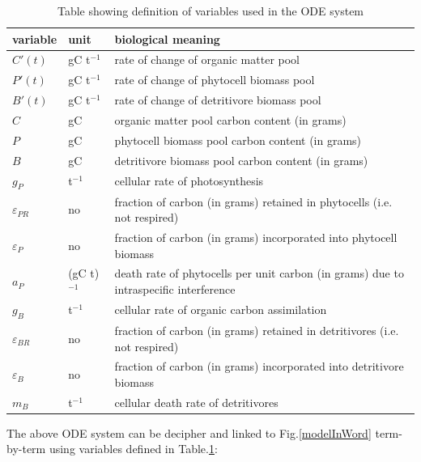 \documentclass[../thesis.tex]{subfiles} %
\newcommand{\gP}{g_P}
\newcommand{\eP}{\varepsilon_P}
\newcommand{\aP}{a_P}
\newcommand{\ePR}{\varepsilon_{PR}}
\newcommand{\gB}{g_B}
\newcommand{\eB}{\varepsilon_B}
\newcommand{\mB}{m_B}
\newcommand{\eBR}{\varepsilon_{BR}}
\begin{document}
\begin{table}[H]
    \centering
    \caption[Algebra variables definitions]{Table showing definition of variables used in the ODE system}
    \begin{tabular}{p{.1\linewidth}p{.1\linewidth}p{.7\linewidth}}\hline
        variable & unit & biological meaning \\\hline
        $C'(t)$ & gC t$^{-1}$ & rate of change of organic matter pool\\
        $P'(t)$ & gC t$^{-1}$ & rate of change of phytocell biomass pool\\
        $B'(t)$ & gC t$^{-1}$ & rate of change of detritivore biomass pool\\
        $C$ & gC & organic matter pool carbon content (in grams)\\
        $P$ & gC & phytocell  biomass pool carbon content (in grams)\\
        $B$ & gC & detritivore biomass pool carbon content (in grams)\\
        $\gP$ & t$^{-1}$ & cellular rate of photosynthesis\\
        $\ePR$ & no & fraction of carbon (in grams) retained in phytocells (i.e. not respired)\\
        $\eP$ & no & fraction of carbon (in grams) incorporated into phytocell biomass\\
        $\aP$ & (gC t)$^{-1}$ & death rate of phytocells per unit carbon (in grams) due to intraspecific interference\\
        $\gB$ & t$^{-1}$ & cellular rate of organic carbon assimilation\\
        $\eBR$ & no & fraction of carbon (in grams) retained in detritivores (i.e. not respired)\\
        $\eB$ & no & fraction of carbon (in grams) incorporated into detritivore biomass\\
        $\mB$ & t$^{-1}$ & cellular death rate of detritivores\\\hline
    \end{tabular}
    \label{varInTab}
\end{table}

The above ODE system can be decipher and linked to Fig.\ref{modelInWord} term-by-term using variables defined in Table.\ref{varInTab}:
\end{document}
